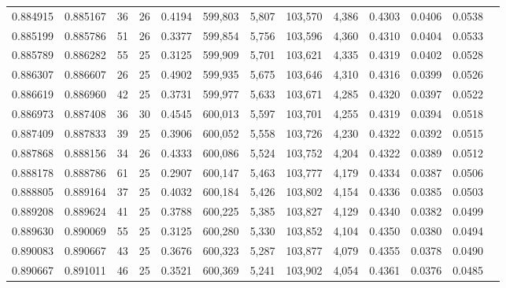 \begin{tabular}{rrrrrrrrrrrrr}
0.884915 & 0.885167 &    36 &  26 &                                     0.4194 & 599,803 &   5,807 & 103,570 &   4,386 & 0.4303 & 0.0406 & 0.0538 \\
0.885199 & 0.885786 &    51 &  26 &                                     0.3377 & 599,854 &   5,756 & 103,596 &   4,360 & 0.4310 & 0.0404 & 0.0533 \\
0.885789 & 0.886282 &    55 &  25 &                                     0.3125 & 599,909 &   5,701 & 103,621 &   4,335 & 0.4319 & 0.0402 & 0.0528 \\
0.886307 & 0.886607 &    26 &  25 &                                     0.4902 & 599,935 &   5,675 & 103,646 &   4,310 & 0.4316 & 0.0399 & 0.0526 \\
0.886619 & 0.886960 &    42 &  25 &                                     0.3731 & 599,977 &   5,633 & 103,671 &   4,285 & 0.4320 & 0.0397 & 0.0522 \\
0.886973 & 0.887408 &    36 &  30 &                                     0.4545 & 600,013 &   5,597 & 103,701 &   4,255 & 0.4319 & 0.0394 & 0.0518 \\
0.887409 & 0.887833 &    39 &  25 &                                     0.3906 & 600,052 &   5,558 & 103,726 &   4,230 & 0.4322 & 0.0392 & 0.0515 \\
0.887868 & 0.888156 &    34 &  26 &                                     0.4333 & 600,086 &   5,524 & 103,752 &   4,204 & 0.4322 & 0.0389 & 0.0512 \\
0.888178 & 0.888786 &    61 &  25 &                                     0.2907 & 600,147 &   5,463 & 103,777 &   4,179 & 0.4334 & 0.0387 & 0.0506 \\
0.888805 & 0.889164 &    37 &  25 &                                     0.4032 & 600,184 &   5,426 & 103,802 &   4,154 & 0.4336 & 0.0385 & 0.0503 \\
0.889208 & 0.889624 &    41 &  25 &                                     0.3788 & 600,225 &   5,385 & 103,827 &   4,129 & 0.4340 & 0.0382 & 0.0499 \\
0.889630 & 0.890069 &    55 &  25 &                                     0.3125 & 600,280 &   5,330 & 103,852 &   4,104 & 0.4350 & 0.0380 & 0.0494 \\
0.890083 & 0.890667 &    43 &  25 &                                     0.3676 & 600,323 &   5,287 & 103,877 &   4,079 & 0.4355 & 0.0378 & 0.0490 \\
0.890667 & 0.891011 &    46 &  25 &                                     0.3521 & 600,369 &   5,241 & 103,902 &   4,054 & 0.4361 & 0.0376 & 0.0485 \\

\end{tabular}
